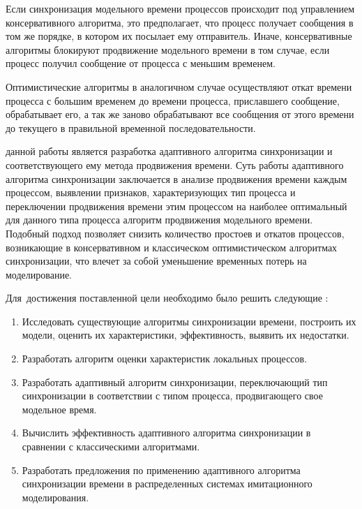 Если синхронизация модельного времени процессов происходит под управлением консервативного алгоритма, это предполагает, что процесс получает сообщения в том же порядке, в котором их посылает ему отправитель.
Иначе, консервативные алгоритмы блокируют продвижение модельного времени в том случае, если процесс получил сообщение от процесса с меньшим временем.

Оптимистические алгоритмы в аналогичном случае осуществляют откат времени процесса с большим временем до времени процесса, приславшего сообщение, обрабатывает его, а так же заново обрабатывают все сообщения от этого времени до текущего в правильной временной последовательности.




{\aim} данной работы является разработка адаптивного алгоритма синхронизации и соответствующего ему метода продвижения времени. Суть работы адаптивного алгоритма синхронизации заключается в анализе продвижения времени каждым процессом, выявлении признаков, характеризующих тип процесса и переключении продвижения времени этим процессом на наиболее оптимальный для данного типа процесса алгоритм продвижения модельного времени. Подобный подход позволяет снизить количество простоев и откатов процессов, возникающие в консервативном и классическом оптимистическом алгоритмах синхронизации, что влечет за собой уменьшение временных потерь на моделирование.


Для~достижения поставленной цели необходимо было решить следующие {\tasks}:
\begin{enumerate}
    \item Исследовать существующие алгоритмы синхронизации времени, построить их модели, оценить их характеристики, эффективность, выявить их недостатки.
  \item Разработать алгоритм оценки характеристик локальных процессов.
  \item Разработать адаптивный алгоритм синхронизации, переключающий тип синхронизации в соответствии с типом процесса, продвигающего свое модельное время.
  \item Вычислить эффективность адаптивного алгоритма синхронизации в сравнении с классическими алгоритмами.
  \item Разработать предложения по применению адаптивного алгоритма синхронизации времени в распределенных системах имитационного моделирования.
\end{enumerate}


